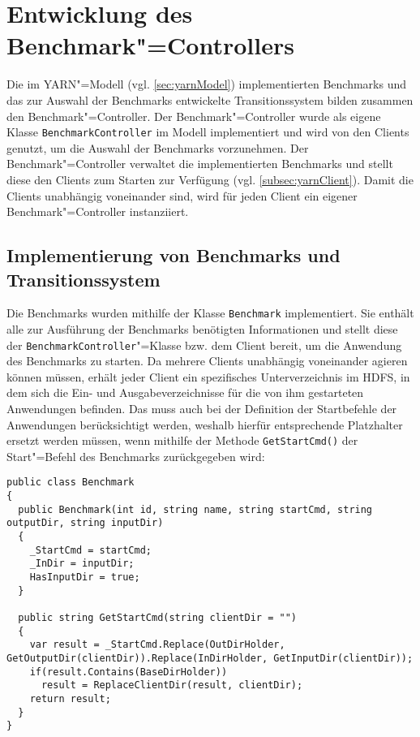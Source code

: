 \section{Entwicklung des Benchmark"=Controllers}
\label{sec:benchmarkController}

Die im \ac{YARN}"=Modell (vgl. \cref{sec:yarnModel}) implementierten Benchmarks und das zur Auswahl der Benchmarks entwickelte Transitionssystem bilden zusammen den Benchmark"=Controller.
Der Benchmark"=Controller wurde als eigene Klasse \texttt{BenchmarkController} im Modell implementiert und wird von den Clients genutzt, um die Auswahl der Benchmarks vorzunehmen.
Der Benchmark"=Controller verwaltet die implementierten Benchmarks und stellt diese den Clients zum Starten zur Verfügung (vgl. \cref{subsec:yarnClient}).
Damit die Clients unabhängig voneinander sind, wird für jeden Client ein eigener Benchmark"=Controller instanziiert.

\subsection{Implementierung von Benchmarks und Transitionssystem}
\label{subsec:appImplementation}

Die Benchmarks wurden mithilfe der Klasse \texttt{Benchmark} implementiert.
Sie enthält alle zur Ausführung der Benchmarks benötigten Informationen und stellt diese der \texttt{BenchmarkController}"=Klasse bzw. dem Client bereit, um die Anwendung des Benchmarks zu starten.
Da mehrere Clients unabhängig voneinander agieren können müssen, erhält jeder Client ein spezifisches Unterverzeichnis im \ac{HDFS}, in dem sich die Ein- und Ausgabeverzeichnisse für die von ihm gestarteten Anwendungen befinden.
Das muss auch bei der Definition der Startbefehle der Anwendungen berücksichtigt werden, weshalb hierfür entsprechende Platzhalter ersetzt werden müssen, wenn mithilfe der Methode \texttt{GetStartCmd()} der Start"=Befehl des Benchmarks zurückgegeben wird:

\begin{lstlisting}[label=lst:benchmarkClass,style=cs,
caption={[Wesentliche Methoden der Klasse Benchmark]
    Wesentliche Methoden der Klasse \texttt{Benchmark}}]
public class Benchmark
{
  public Benchmark(int id, string name, string startCmd, string outputDir, string inputDir)
  {
    _StartCmd = startCmd;
    _InDir = inputDir;
    HasInputDir = true;
  }
  
  public string GetStartCmd(string clientDir = "")
  {
    var result = _StartCmd.Replace(OutDirHolder, GetOutputDir(clientDir)).Replace(InDirHolder, GetInputDir(clientDir));
    if(result.Contains(BaseDirHolder))
      result = ReplaceClientDir(result, clientDir);
    return result;
  }
}
\end{lstlisting}

